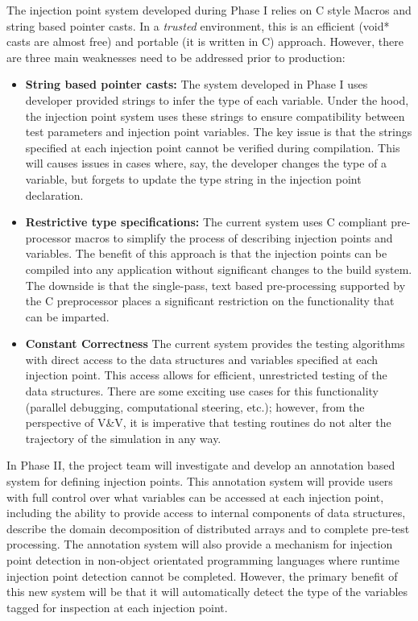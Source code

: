 The injection point system developed during Phase I relies on C style Macros and string based pointer casts. In a \emph{trusted} environment, this is an efficient (void* casts are almost free) and portable (it is written in C)  approach. However, there are three main weaknesses need to be addressed prior to production:

\begin{itemize}
 \item {\bf String based pointer casts:} The system developed in Phase I uses developer provided strings to infer the type of each variable. Under the hood, the injection point system uses these strings to ensure compatibility between test parameters and injection point variables. The key issue is that the strings specified at each injection point cannot be verified during compilation. This will causes issues in cases where, say, the developer changes the type of a variable, but forgets to update the type string in the injection point declaration.  
  
 \item {\bf Restrictive type specifications:} The current system uses C compliant pre-processor macros to simplify the process of describing injection points and variables. The benefit of this approach is that the injection points can be compiled into any application without significant changes to the build system. The downside is that the single-pass, text based pre-processing supported by the C preprocessor places a significant restriction on the functionality that can be imparted.
 
 \item{\bf Constant Correctness} The current system provides the testing algorithms with direct access to the data structures and variables specified at each injection point. This access allows for efficient, unrestricted testing of the data structures. There are some exciting use cases for this functionality (parallel debugging, computational steering, etc.); however, from the perspective of V\&V, it is imperative that testing routines do not alter the trajectory of the simulation in any way.  
\end{itemize}
 
In Phase II, the project team will investigate and develop an annotation based system for defining injection points. This annotation system will provide users with full control over what variables can be accessed at each injection point, including the ability to provide access to internal components of data structures, describe the domain decomposition of distributed arrays and to complete pre-test processing. The annotation system will also provide a mechanism for injection point detection in non-object orientated programming languages where runtime injection point detection cannot be completed. However, the primary benefit of this new system will be that it will automatically detect the type of the variables tagged for inspection at each injection point.  

